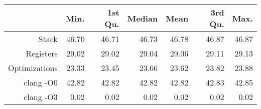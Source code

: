 \begin{table}[ht]
\centering
\begin{tabular}{rrrrrrr}
  \hline
 & Min. & 1st Qu. & Median & Mean & 3rd Qu. & Max. \\ 
  \hline
Stack & 46.70 & 46.71 & 46.73 & 46.78 & 46.87 & 46.87 \\ 
  Registers & 29.02 & 29.02 & 29.04 & 29.06 & 29.11 & 29.13 \\ 
  Optimizations & 23.33 & 23.45 & 23.66 & 23.62 & 23.82 & 23.88 \\ 
  clang -O0 & 42.82 & 42.82 & 42.82 & 42.82 & 42.83 & 42.85 \\ 
  clang -O3 & 0.02 & 0.02 & 0.02 & 0.02 & 0.02 & 0.02 \\ 
   \hline
\end{tabular}
\end{table}
